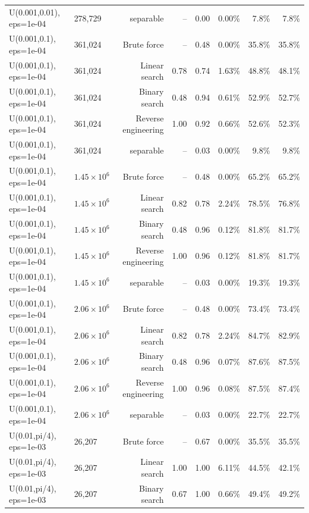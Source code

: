 \begin{tabular}{llrrrrrr}
U(0.001,0.01), eps=1e-04 & 278,729 & separable & -- & 0.00 & 0.00\% & 7.8\% & 7.8\% \\
U(0.001,0.1), eps=1e-04 & 361,024 & Brute force & -- & 0.48 & 0.00\% & 35.8\% & 35.8\% \\
U(0.001,0.1), eps=1e-04 & 361,024 & Linear search & 0.78 & 0.74 & 1.63\% & 48.8\% & 48.1\% \\
U(0.001,0.1), eps=1e-04 & 361,024 & Binary search & 0.48 & 0.94 & 0.61\% & 52.9\% & 52.7\% \\
U(0.001,0.1), eps=1e-04 & 361,024 & Reverse engineering & 1.00 & 0.92 & 0.66\% & 52.6\% & 52.3\% \\
U(0.001,0.1), eps=1e-04 & 361,024 & separable & -- & 0.03 & 0.00\% & 9.8\% & 9.8\% \\
U(0.001,0.1), eps=1e-04 & $1.45\times 10^{6}$ & Brute force & -- & 0.48 & 0.00\% & 65.2\% & 65.2\% \\
U(0.001,0.1), eps=1e-04 & $1.45\times 10^{6}$ & Linear search & 0.82 & 0.78 & 2.24\% & 78.5\% & 76.8\% \\
U(0.001,0.1), eps=1e-04 & $1.45\times 10^{6}$ & Binary search & 0.48 & 0.96 & 0.12\% & 81.8\% & 81.7\% \\
U(0.001,0.1), eps=1e-04 & $1.45\times 10^{6}$ & Reverse engineering & 1.00 & 0.96 & 0.12\% & 81.8\% & 81.7\% \\
U(0.001,0.1), eps=1e-04 & $1.45\times 10^{6}$ & separable & -- & 0.03 & 0.00\% & 19.3\% & 19.3\% \\
U(0.001,0.1), eps=1e-04 & $2.06\times 10^{6}$ & Brute force & -- & 0.48 & 0.00\% & 73.4\% & 73.4\% \\
U(0.001,0.1), eps=1e-04 & $2.06\times 10^{6}$ & Linear search & 0.82 & 0.78 & 2.24\% & 84.7\% & 82.9\% \\
U(0.001,0.1), eps=1e-04 & $2.06\times 10^{6}$ & Binary search & 0.48 & 0.96 & 0.07\% & 87.6\% & 87.5\% \\
U(0.001,0.1), eps=1e-04 & $2.06\times 10^{6}$ & Reverse engineering & 1.00 & 0.96 & 0.08\% & 87.5\% & 87.4\% \\
U(0.001,0.1), eps=1e-04 & $2.06\times 10^{6}$ & separable & -- & 0.03 & 0.00\% & 22.7\% & 22.7\% \\
U(0.01,pi/4), eps=1e-03 & 26,207 & Brute force & -- & 0.67 & 0.00\% & 35.5\% & 35.5\% \\
U(0.01,pi/4), eps=1e-03 & 26,207 & Linear search & 1.00 & 1.00 & 6.11\% & 44.5\% & 42.1\% \\
U(0.01,pi/4), eps=1e-03 & 26,207 & Binary search & 0.67 & 1.00 & 0.66\% & 49.4\% & 49.2\% \\

\end{tabular}
